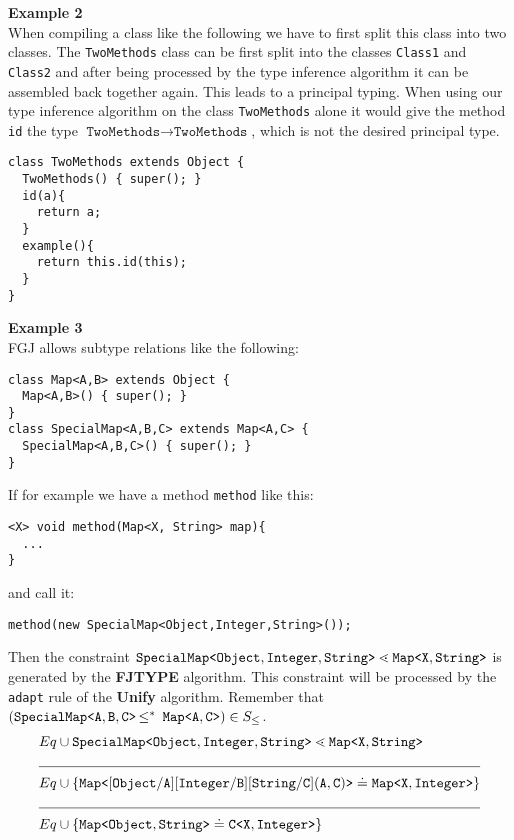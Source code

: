 \documentclass[a4paper,USenglish,cleveref, autoref, thm-restate]{lipics-v2021}
\begin{document}
\textbf{Example 2}\\
When compiling a class like the following
we have to first split this class into two classes.
The \texttt{TwoMethods} class can be first split into the classes \texttt{Class1}
and \texttt{Class2} and after being processed by the type inference algorithm it can be assembled back together again.
This leads to a principal typing.
When using our type inference algorithm on the class \texttt{TwoMethods} alone
it would give the method \texttt{id} the type $\texttt{TwoMethods} \to \texttt{TwoMethods}$,
which is not the desired principal type.
\begin{lstlisting}
class TwoMethods extends Object {
  TwoMethods() { super(); }
  id(a){
    return a;
  }
  example(){
    return this.id(this);
  }
}
\end{lstlisting}

\textbf{Example 3}\\
FGJ allows subtype relations like the following:
\begin{lstlisting}
class Map<A,B> extends Object {
  Map<A,B>() { super(); }
}
class SpecialMap<A,B,C> extends Map<A,C> {
  SpecialMap<A,B,C>() { super(); }
}
\end{lstlisting}

If for example we have a method \texttt{method} like this:
\begin{lstlisting}
<X> void method(Map<X, String> map){
  ...
}
\end{lstlisting}
and call it:
\begin{lstlisting}
method(new SpecialMap<Object,Integer,String>());
\end{lstlisting}

Then the constraint $\mathtt{SpecialMap \texttt{<} Object,Integer,String \texttt{>} } \lessdot \mathtt{Map \texttt{<} X,String \texttt{>} }$
is generated by the \textbf{FJTYPE} algorithm.
This constraint will be processed by the \texttt{adapt} rule of the \textbf{Unify} algorithm.
Remember that $(\mathtt{SpecialMap \texttt{<} A,B,C \texttt{>} } \textrm{$\, \leq^\ast \,$}\  \mathtt{Map \texttt{<} A,C \texttt{>} }) \in S_\leq$.
\begin{align*}
  Eq& \cup \exptype{SpecialMap}{Object,Integer,String} \lessdot \exptype{Map}{X,String} \\
  \cline{1-2} 
  Eq& \cup \set{\exptype{Map}{[ Object / A ][ Integer / B ][ String / C ](A,C)}
  \doteq \exptype{Map}{X,Integer}} \\
  \cline{1-2} 
  Eq& \cup \set{\exptype{Map}{Object,String}
  \doteq \exptype{C}{X, Integer}}
\end{align*}
\end{document}
